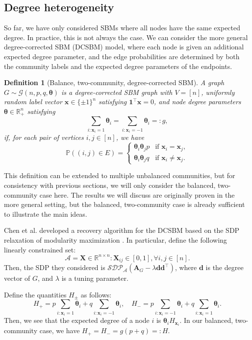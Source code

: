 \documentclass[11pt, titlepage]{article} %
\numberwithin{equation}{section}
\newtheorem{definition}{Definition}
\theoremstyle{definition}
\numberwithin{theorem}{section}
\numberwithin{lemma}{section}
\numberwithin{corollary}{section}
\numberwithin{proposition}{section}
\numberwithin{definition}{section}
\numberwithin{remark}{section}
\begin{document}
\subsection{Degree heterogeneity}
So far, we have only considered SBMs where all nodes have the same expected degree. In practice, 
this is not always the case. We can consider the more general degree-corrected SBM (DCSBM) model, 
where each node is given an additional expected degree parameter, and the edge probabilities are
determined by both the community labels and the expected degree parameters of the endpoints.
\begin{definition}[Balance, two-community, degree-corrected SBM]
A graph $G \sim \mathcal{G}(n, p, q, \bm{\theta})$ is a degree-corrected SBM graph with $V = [n]$, 
uniformly random label vector $\bm{x} \in \{\pm 1\}^n$ satisfying $\bm{1}^\top \bm{x} = 0$,
and node degree parameters $\bm{\theta} \in \mathbb{R}_+^n$ satisfying 
\[
\sum_{i: \bm{x}_i = 1} \bm{\theta}_i = \sum_{i: \bm{x}_i = -1} \bm{\theta}_i =: g,
\]
if, for each pair of vertices $i, j \in [n]$, we have
\[\mathbb{P}((i,j) \in E) = \begin{cases}
\bm{\theta}_i \bm{\theta}_j p & \text{if } \bm{x}_i = \bm{x}_j, \\
\bm{\theta}_i \bm{\theta}_j q & \text{if } \bm{x}_i \neq \bm{x}_j.
\end{cases}\]
\end{definition}
This definition can be extended to multiple unbalanced communities, but for consistency with previous
sections, we will only consider the balanced, two-community case here. The results we will discuss
are originally proven in the more general setting, but the balanced, two-community case is already
sufficient to illustrate the main ideas.

Chen et al. \cite{CLX18} developed a recovery algorithm for the DCSBM based on the SDP relaxation
of modularity maximization \cite{Newman06}. In particular, define the following linearly
constrained set:
\[
\mathcal{A} = {\bm{X} \in \mathbb{R}^{n\times n}: \bm{X}_{ij} \in [0,1], \forall i,j \in [n]}.
\]
Then, the SDP they considered is $\mathcal{SDP}_\mathcal{A}(\bm{A}_G - \lambda \bm{d}\bm{d}^\top)$,
where $\bm{d}$ is the degree vector of $G$, and $\lambda$ is a tuning parameter.

Define the quantities $H_\pm$ as follows:
\[
H_+ = p \sum_{i: \bm{x}_i = 1} \bm{\theta}_i + q \sum_{i: \bm{x}_i = -1} \bm{\theta}_i, \quad
H_- = p \sum_{i: \bm{x}_i = -1} \bm{\theta}_i + q \sum_{i: \bm{x}_i = 1} \bm{\theta}_i.
\]
Then, we see that the expected degree of a node $i$ is $\bm{\theta}_i H_{\bm{x}_i}$.
In our balanced, two-community case, we have $H_+ = H_- = g(p + q) =: H$.
\end{document}
